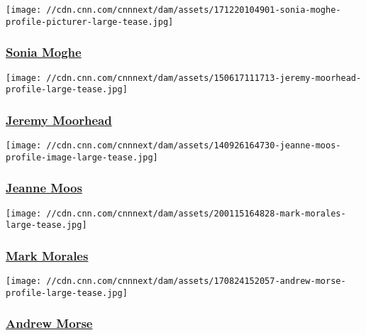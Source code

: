 \href{/profiles/sonia-moghe}{}

\texttt{[image: //cdn.cnn.com/cnnnext/dam/assets/171220104901-sonia-moghe-profile-picturer-large-tease.jpg]}

\hypertarget{sonia-moghe}{%
\subsubsection{\texorpdfstring{\href{/profiles/sonia-moghe}{Sonia
Moghe}}{Sonia Moghe}}\label{sonia-moghe}}

\href{/profiles/jeremy-moorhead}{}

\texttt{[image: //cdn.cnn.com/cnnnext/dam/assets/150617111713-jeremy-moorhead-profile-large-tease.jpg]}

\hypertarget{jeremy-moorhead}{%
\subsubsection{\texorpdfstring{\href{/profiles/jeremy-moorhead}{Jeremy
Moorhead}}{Jeremy Moorhead}}\label{jeremy-moorhead}}

\href{/profiles/jeanne-moos-profile}{}

\texttt{[image: //cdn.cnn.com/cnnnext/dam/assets/140926164730-jeanne-moos-profile-image-large-tease.jpg]}

\hypertarget{jeanne-moos}{%
\subsubsection{\texorpdfstring{\href{/profiles/jeanne-moos-profile}{Jeanne
Moos}}{Jeanne Moos}}\label{jeanne-moos}}

\href{/profiles/mark-morales}{}

\texttt{[image: //cdn.cnn.com/cnnnext/dam/assets/200115164828-mark-morales-large-tease.jpg]}

\hypertarget{mark-morales}{%
\subsubsection{\texorpdfstring{\href{/profiles/mark-morales}{Mark
Morales}}{Mark Morales}}\label{mark-morales}}

\href{/profiles/andrew-morse-profile}{}

\texttt{[image: //cdn.cnn.com/cnnnext/dam/assets/170824152057-andrew-morse-profile-large-tease.jpg]}

\hypertarget{andrew-morse}{%
\subsubsection{\texorpdfstring{\href{/profiles/andrew-morse-profile}{Andrew
Morse}}{Andrew Morse}}\label{andrew-morse}}

